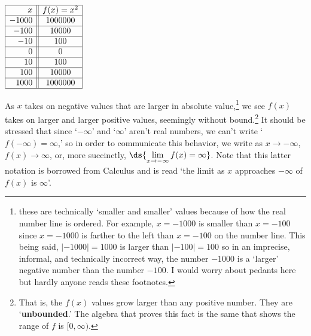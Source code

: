 \documentclass{ximera}
\begin{document}
 
 

\begin{center}
$\begin{array}{|r||c|}  \hline

 x &  f(x) = x^2  \\ \hline
 -1000 & 1000000 \\  \hline
 -100 & 10000 \\  \hline
 -10 & 100  \\  \hline
 0 &  0  \\  \hline
 10 & 100  \\  \hline
 100&  10000 \\  \hline
 1000 & 1000000 \\  \hline

\end{array}$
\end{center}






 
As $x$ takes on negative values that are larger in absolute value,\footnote{these are technically `smaller and smaller' values because of how the real number line is ordered. For example, $x = -1000$ is smaller than $x = -100$ since $x = -1000$ is farther to the left than $x = -100$ on the number line. This being said, $|-1000| = 1000$ is larger than $|-100| = 100$ so in an imprecise, informal, and technically incorrect way, the number $-1000$ is a `larger' negative number than the number $-100$.  I would worry about pedants here but  hardly anyone reads these footnotes.}  we see $f(x)$ takes on larger and larger positive values, seemingly without bound.\footnote{That is, the $f(x)$ values grow larger than any positive number.  They are `\textbf{unbounded}.'  The algebra that proves this fact  is the same that shows the range of $f$ is $[0, \infty)$.}   It should be stressed that since `$-\infty$' and `$\infty$' aren't real numbers, we can't write `$f(-\infty) = \infty$,'  so in order to communicate this behavior, we write as $x \rightarrow -\infty$, $f(x) \rightarrow \infty$, or, more succinctly, $\ds{ \lim_{x \rightarrow - \infty} f(x) = \infty}$.  Note that this latter notation is borrowed from Calculus and is read `the limit as $x$ approaches $- \infty$ of $f(x)$ is $\infty$'.  
\end{document}
